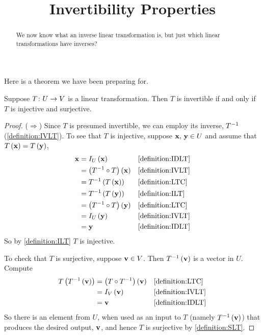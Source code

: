 \documentclass{ximera}
\title{Invertibility Properties}
\begin{document}
\begin{abstract}
  We now know what an inverse linear transformation is, but just which
  linear transformations have inverses?
\end{abstract}
\maketitle

Here is a theorem we have been preparing for.

\begin{theorem}
\label{theorem:ILTIS}


Suppose $T\colon U\rightarrow V$ is a linear transformation.  Then $T$ is invertible if and only if $T$ is injective and surjective.




\begin{proof}
($\Rightarrow$)  Since $T$ is presumed invertible, we can employ its inverse, $T^{-1}$ (\ref{definition:IVLT}).  To see that $T$ is injective, suppose $\mathbf{x},\,\mathbf{y}\in U$ and assume that $T\left(\mathbf{x}\right)=T\left(\mathbf{y}\right)$,
\begin{align*}
\mathbf{x}
&=I_U\left(\mathbf{x}\right)&&\ref{definition:IDLT}\\
&=\left({T^{-1}}\circ{T}\right)\left(\mathbf{x}\right)&&\ref{definition:IVLT}\\
&=T^{-1}\left(T\left(\mathbf{x}\right)\right)&&\ref{definition:LTC}\\
&=T^{-1}\left(T\left(\mathbf{y}\right)\right)&&\ref{definition:ILT}\\
&=\left({T^{-1}}\circ{T}\right)\left(\mathbf{y}\right)&&\ref{definition:LTC}\\
&=I_U\left(\mathbf{y}\right)&&\ref{definition:IVLT}\\
&=\mathbf{y}&&\ref{definition:IDLT}
\end{align*}
So by \ref{definition:ILT} $T$ is injective.



To check that $T$ is surjective, suppose $\mathbf{v}\in V$.  Then $T^{-1}\left(\mathbf{v}\right)$ is a vector in $U$.  Compute
\begin{align*}
T\left(T^{-1}\left(\mathbf{v}\right)\right)
&=\left({T}\circ{T^{-1}}\right)\left(\mathbf{v}\right)&&\ref{definition:LTC}\\
&=I_V\left(\mathbf{v}\right)&&\ref{definition:IVLT}\\
&=\mathbf{v}&&\ref{definition:IDLT}
\end{align*}
So there is an element from $U$, when used as an input to $T$ (namely $T^{-1}\left(\mathbf{v}\right)$) that produces the desired output, $\mathbf{v}$, and hence $T$ is surjective by \ref{definition:SLT}.




\end{proof}
\end{theorem}
\end{document}
